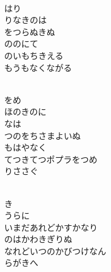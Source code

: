 \documentclass[10pt,b5j]{tarticle} %
\begin{document}
\vspace{1.5em} %
\newcommand{\linespace}{0.5em} %
\newcommand{\blocksize}{0.5\hsize} %
\newcommand{\itemmargin}{3em} %
\begin{enumerate} %
    \setlength{\itemindent}{\itemmargin} %
    \begin{minipage}[c]{\blocksize}
    
        \vspace{\linespace}
        \item~\\
        はり\\
        りなきのは\\
        をつらぬきぬ\\
        ののにて\\
        のいもちきえる\\
        もうもなくながる
        
    \end{minipage}
    \begin{minipage}[c]{\blocksize}
        
        \vspace{\linespace}
        \item~\\
        をめ\\
        ほのきのに\\
        なは\\
        つのをちさまよいぬ\\
        もはやなく\\
        てつきてつポプラをつめ\\
        りささぐ
        
    \end{minipage}
    \begin{minipage}[c]{\blocksize}
        
        \vspace{\linespace}
        \item~\\
        き\\
        うらに\\
        いまだあれどかすかなり\\
        のはかわきぎりぬ\\
        なれどいつのかびつけなん\\
        らがきへ
        

\end{minipage}
\end{enumerate}
\end{document}
